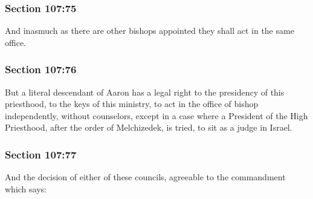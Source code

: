 	\subsubsection{Section 107:75} %
		\label{DC107-75}

		And inasmuch as there are other bishops appointed they shall act in the same office.


	\subsubsection{Section 107:76} %
		\label{DC107-76}

		But a literal descendant of Aaron has a legal right to the presidency of this priesthood, to the keys of this ministry, to act in the office of bishop independently, without counselors, except in a case where a President of the High Priesthood, after the order of Melchizedek, is tried, to sit as a judge in Israel.


	\subsubsection{Section 107:77} %
		\label{DC107-77}

		And the decision of either of these councils, agreeable to the commandment which says:


